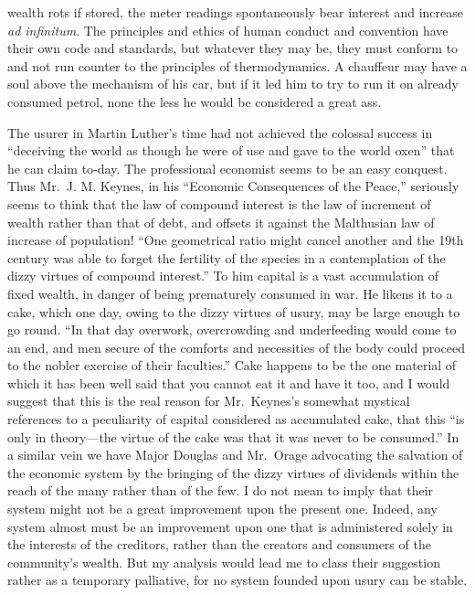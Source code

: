 \documentclass[10.5pt,twoside]{book}
\newcommand{\origpage}[1]{\clearpage\setcounter{page}{#1}}
\begin{document}
\origpage{29}

\noindent wealth rots if stored, the meter readings spontaneously bear
interest and increase \textit{ad infinitum}. The principles and ethics of
human conduct and convention have their own code and standards, but whatever
they may be, they must conform to and not run counter to the principles of
thermodynamics. A chauffeur may have a soul above the mechanism of his car,
but if it led him to try to run it on already consumed petrol, none the less
he would be considered a great ass.

The usurer in Martin Luther's time had not achieved the colossal success in
``deceiving the world as though he were of use and gave to the world oxen''
that he can claim to-day. The professional economist seems to be an easy
conquest. Thus Mr.\ J. M. Keynes, in his ``Economic Consequences of the
Peace,'' seriously seems to think that the law of compound interest is the law
of increment of wealth rather than that of debt, and offsets it against the
Malthusian law of increase of population! ``One geometrical ratio might cancel
another and the 19th century was able to forget the fertility of the species
in a contemplation of the dizzy virtues of compound interest.'' To him capital
is a vast accumulation of fixed wealth, in danger of being prematurely
consumed in war. He likens it to a cake, which one day, owing to the dizzy
virtues of usury, may be large enough to go round. ``In that day overwork,
overcrowding and underfeeding would come to an end, and men secure of the
comforts and necessities of the body could proceed to the nobler exercise of
their faculties.'' Cake happens to be the one material of which it has been
well said that you cannot eat it and have it too, and I would suggest that
this is the real reason for Mr.\ Keynes's somewhat mystical references to a
peculiarity of capital considered as accumulated cake, that this ``is only in
theory---the virtue of the cake was that it was never to be consumed.'' In a
similar vein we have Major Douglas and Mr.\ Orage advocating the salvation of
the economic system by the bringing of the dizzy virtues of dividends within
the reach of the many rather than of the few. I do not mean to imply that
their system might not be a great improvement upon the present one. Indeed,
any system almost must be an improvement upon one that is administered solely
in the interests of the creditors, rather than the creators and consumers of
the community's wealth. But my analysis would lead me to class their
suggestion rather as a temporary palliative, for no system founded upon usury
can be stable.
\end{document}

